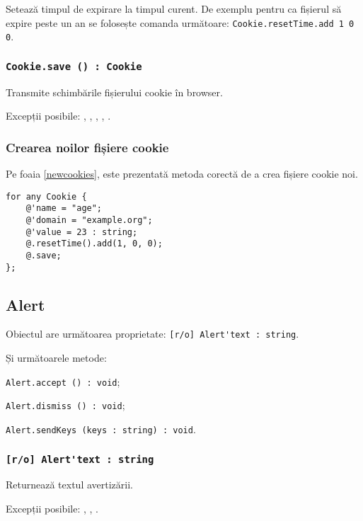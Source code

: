 Setează timpul de expirare la timpul curent. De exemplu pentru ca fișierul să expire peste un an se folosește comanda următoare: \lstinline|Cookie.resetTime.add 1 0 0|.

\subsubsection{\lstinline|Cookie.save () : Cookie|}

Transmite schimbările fișierului cookie în browser.

Excepții posibile: , , , , .

\subsubsection{Crearea noilor fișiere cookie}

Pe foaia \ref{newcookies}, este prezentată metoda corectă de a crea fișiere cookie noi.

\begin{lstlisting}[caption=Crearea noilor fișiere cookie, label=newcookies]
for any Cookie {
	@'name = "age";
	@'domain = "example.org";
	@'value = 23 : string;
	@.resetTime().add(1, 0, 0);
	@.save;
};
\end{lstlisting}


\subsection{{\color{orange} Alert}}

Obiectul \alert{} are următoarea proprietate: \lstinline|[r/o] Alert'text : string|.

Și următoarele metode:
\begin{icItems}
	\item \lstinline|Alert.accept () : void|;
	\item \lstinline|Alert.dismiss () : void|;
	\item \lstinline|Alert.sendKeys (keys : string) : void|.
\end{icItems}

\subsubsection{\lstinline|[r/o] Alert'text : string|}

Returnează textul avertizării.

Excepții posibile: , , .

